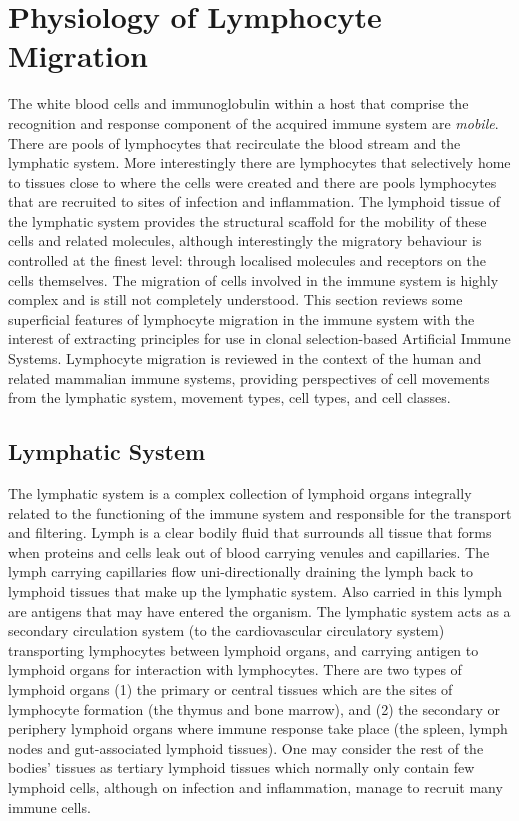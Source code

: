 \section{Physiology of Lymphocyte Migration}
\label{sec:tissues:migration}
The white blood cells and immunoglobulin within a host that comprise the recognition and response component of the acquired immune system are \emph{mobile}. There are pools of lymphocytes that recirculate the blood stream and the lymphatic system. More interestingly there are lymphocytes that selectively home to tissues close to where the cells were created and there are pools lymphocytes that are recruited to sites of infection and inflammation. The lymphoid tissue of the lymphatic system provides the structural scaffold for the mobility of these cells and related molecules, although interestingly the migratory behaviour is controlled at the finest level: through localised molecules and receptors on the cells themselves. The migration of cells involved in the immune system is highly complex and is still not completely understood. This section reviews some superficial features of lymphocyte migration in the immune system with the interest of extracting principles for use in clonal selection-based Artificial Immune Systems. Lymphocyte migration is reviewed in the context of the human and related mammalian immune systems, providing perspectives of cell movements from the lymphatic system, movement types, cell types, and cell classes. 

%
%
\subsection{Lymphatic System}
\label{subsec:tissues:migration:lymphatic}
The lymphatic system is a complex collection of lymphoid organs integrally related to the functioning of the immune system and responsible for the transport and filtering. Lymph is a clear bodily fluid that surrounds all tissue that forms when proteins and cells leak out of blood carrying venules and capillaries. The lymph carrying capillaries flow uni-directionally draining the lymph back to lymphoid tissues that make up the lymphatic system. Also carried in this lymph are antigens that may have entered the organism. The lymphatic system acts as a secondary circulation system (to the cardiovascular circulatory system) transporting lymphocytes between lymphoid organs, and carrying antigen to lymphoid organs for interaction with lymphocytes. There are two types of lymphoid organs (1) the primary or central tissues which are the sites of lymphocyte formation (the thymus and bone marrow), and (2) the secondary or periphery lymphoid organs where immune response take place (the spleen, lymph nodes and gut-associated lymphoid tissues). One may consider the rest of the bodies' tissues as tertiary lymphoid tissues which normally only contain few lymphoid cells, although on infection and inflammation, manage to recruit many immune cells.

